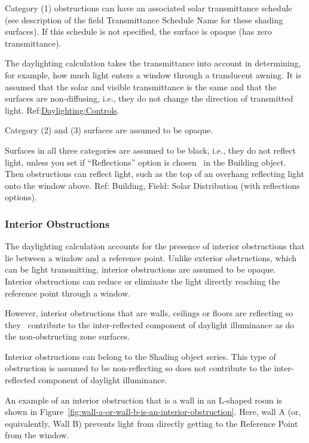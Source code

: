 Category (1) obstructions can have an associated solar transmittance schedule (see description of the field Transmittance Schedule Name for these shading surfaces). If this schedule is not specified, the surface is opaque (has zero transmittance).

The daylighting calculation takes the transmittance into account in determining, for example, how much light enters a window through a translucent awning. It is assumed that the solar and visible transmittance is the same and that the surfaces are non-diffusing, i.e., they do not change the direction of transmitted light. Ref:\hyperref[daylightingcontrols-000]{Daylighting:Controls}.

Category (2) and (3) surfaces are assumed to be opaque.

Surfaces in all three categories are assumed to be black, i.e., they do not reflect light, unless you set if ``Reflections'' option is chosen~ in the Building object. Then obstructions can reflect light, such as the top of an overhang reflecting light onto the window above. Ref: Building, Field: Solar Distribution (with reflections options).

\subsubsection{Interior Obstructions}\label{interior-obstructions}

The daylighting calculation accounts for the presence of interior obstructions that lie between a window and a reference point. Unlike exterior obstructions, which can be light transmitting, interior obstructions are assumed to be opaque. Interior obstructions can reduce or eliminate the light directly reaching the reference point through a window.

However, interior obstructions that are walls, ceilings or floors are reflecting so they~ contribute to the inter-reflected component of daylight illuminance as do the non-obstructing zone surfaces.

Interior obstructions can belong to the Shading object series. This type of obstruction is assumed to be non-reflecting so does not contribute to the inter-reflected component of daylight illuminance.

An example of an interior obstruction that is a wall in an L-shaped room is shown in Figure~\ref{fig:wall-a-or-wall-b-is-an-interior-obstruction}. Here, wall A (or, equivalently, Wall B) prevents light from directly getting to the Reference Point from the window.

